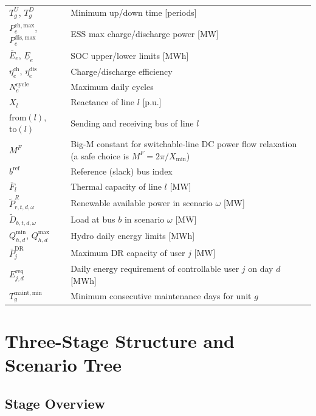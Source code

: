 \documentclass[11pt]{article}
\begin{document}
\begin{longtable}{lL{10.5cm}}
$T^{U}_g$, $T^{D}_g$ & Minimum up/down time [periods] \\
$P^{\mathrm{ch,max}}_e$, $P^{\mathrm{dis,max}}_e$ & ESS max
  charge/discharge power [MW] \\
$\bar{E}_e$, $\underline{E}_e$ & SOC upper/lower limits [MWh] \\
$\eta^{\mathrm{ch}}_e$, $\eta^{\mathrm{dis}}_e$ & Charge/discharge
  efficiency \\
$N^{\mathrm{cycle}}_e$ & Maximum daily cycles \\
$X_l$       & Reactance of line $l$ [p.u.] \\
$\mathrm{from}(l)$, $\mathrm{to}(l)$ & Sending and receiving bus of line $l$ \\
$M^{F}$     & Big-M constant for switchable-line DC power flow relaxation
  (a safe choice is $M^{F} = 2\pi / X_{\min}$) \\
$b^{\mathrm{ref}}$ & Reference (slack) bus index \\
$\bar{F}_l$ & Thermal capacity of line $l$ [MW] \\
$\tilde{P}^{R}_{r,t,d,\omega}$ & Renewable available power in scenario
  $\omega$ [MW] \\
$\tilde{D}_{b,t,d,\omega}$ & Load at bus $b$ in scenario $\omega$ [MW] \\
$Q^{\min}_{h,d}$, $Q^{\max}_{h,d}$ & Hydro daily energy limits [MWh] \\
$\bar{P}^{\mathrm{DR}}_{j}$ & Maximum DR capacity of user $j$ [MW] \\
$E^{\mathrm{req}}_{j,d}$ & Daily energy requirement of controllable
  user $j$ on day $d$ [MWh] \\
$T^{\mathrm{maint,min}}_{g}$ & Minimum consecutive maintenance days
  for unit $g$ \\
\bottomrule
\end{longtable}

\section{Three-Stage Structure and Scenario Tree}
\label{sec:stages}

\subsection{Stage Overview}
\end{document}
